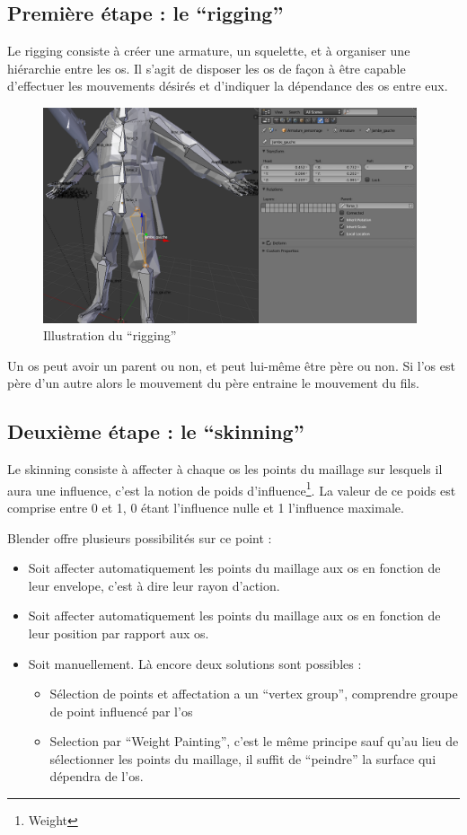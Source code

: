 \documentclass[11pt]{report}
\begin{document}
\subsection{Première étape : le ``rigging''}

Le rigging consiste à créer une armature, un squelette, et à organiser une hiérarchie entre les os.
Il s’agit de disposer les os de façon à être capable d’effectuer les mouvements désirés et d’indiquer la dépendance des os entre eux.

\begin{figure}[htbp]
\centering
\includegraphics[width=11cm]{rigging.png}
\caption{Illustration du ``rigging''}
\end{figure}

Un os peut avoir un parent ou non, et peut lui-même être père ou non. Si l’os est père d’un autre alors le mouvement du père entraine le mouvement du fils.

\subsection{Deuxième étape : le ``skinning''}

Le skinning consiste à affecter à chaque os les points du maillage sur lesquels il aura une influence, c’est la notion de poids d’influence\footnote{Weight}. La valeur de ce poids est comprise entre 0 et 1, 0 étant l’influence nulle et 1 l’influence maximale.

Blender offre plusieurs possibilités sur ce point :

\begin{itemize}
\item Soit affecter automatiquement les points du maillage aux os en  fonction de leur envelope, c’est à dire leur rayon d’action.
\item Soit affecter automatiquement les points du maillage aux os en  fonction de leur position par rapport aux os.
\item Soit manuellement. Là encore deux solutions sont possibles :
\begin{itemize}
	\item Sélection de points et affectation a un ``vertex group'', comprendre groupe de point influencé par l’os
	\item Selection par ``Weight Painting'', c’est le même principe sauf qu’au lieu de sélectionner les points du maillage, il suffit de ``peindre'' la surface qui dépendra de l’os.
\end{itemize}
\end{itemize}
\end{document}
